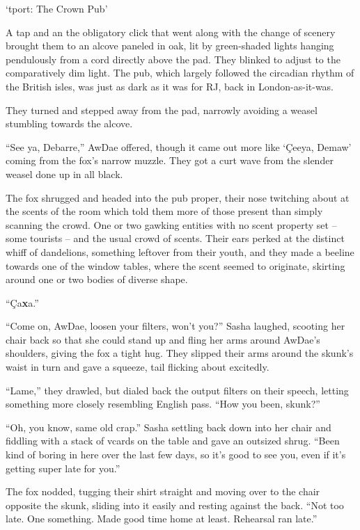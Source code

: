 `tport: The Crown Pub'

A tap and an the obligatory click that went along with the change of scenery brought them to an alcove paneled in oak, lit by green-shaded lights hanging pendulously from a cord directly above the pad.  They blinked to adjust to the comparatively dim light.  The pub, which largely followed the circadian rhythm of the British isles, was just as dark as it was for RJ, back in London-as-it-was.

They turned and stepped away from the pad, narrowly avoiding a weasel stumbling towards the alcove.

``See ya, Debarre,'' AwDae offered, though it came out more like `\c{C}eeya, Demaw' coming from the fox's narrow muzzle.  They got a curt wave from the slender weasel done up in all black.

The fox shrugged and headed into the pub proper, their nose twitching about at the scents of the room which told them more of those present than simply scanning the crowd.  One or two gawking entities with no scent property set -- some tourists -- and the usual crowd of scents.  Their ears perked at the distinct whiff of dandelions, something leftover from their youth, and they made a beeline towards one of the window tables, where the scent seemed to originate, skirting around one or two bodies of diverse shape.

``\c{C}a\textbf{x}a.''

``Come on, AwDae, loosen your filters, won't you?'' Sasha laughed, scooting her chair back so that she could stand up and fling her arms around AwDae's shoulders, giving the fox a tight hug.  They slipped their arms around the skunk's waist in turn and gave a squeeze, tail flicking about excitedly.

``Lame,'' they drawled, but dialed back the output filters on their speech, letting something more closely resembling English pass.  ``How you been, skunk?''

``Oh, you know, same old crap.''  Sasha settling back down into her chair and fiddling with a stack of vcards on the table and gave an outsized shrug.  ``Been kind of boring in here over the last few days, so it's good to see you, even if it's getting super late for you.''

The fox nodded, tugging their shirt straight and moving over to the chair opposite the skunk, sliding into it easily and resting against the back.  ``Not too late.  One something.  Made good time home at least.  Rehearsal ran late.''



